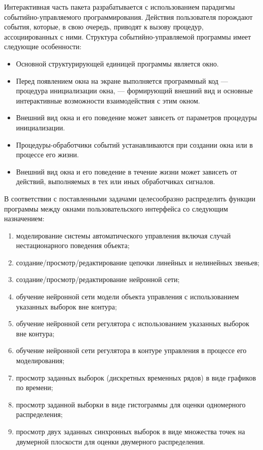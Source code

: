 Интерактивная часть пакета разрабатывается с использованием парадигмы
событийно-управляемого программирования.  Действия пользователя
порождают события, которые, в свою очередь, приводят к вызову
процедур, ассоциированных с ними.  Структура событийно-управляемой
программы имеет следующие особенности:
\begin{itemize}
\item Основной структурирующей единицей программы является окно.
\item Перед появлением окна на экране выполняется программный код ---
  процедура инициализации окна, --- формирующий внешний вид и основные
  интерактивные возможности взаимодействия с этим окном.
\item Внешний вид окна и его поведение может зависеть от параметров
  процедуры инициализации.
\item Процедуры-обработчики событий устанавливаются при создании окна
  или в процессе его жизни.
\item Внешний вид окна и его поведение в течение жизни может зависеть
  от действий, выполняемых в тех или иных обработчиках сигналов.
\end{itemize}

В соответствии с поставленными задачами целесообразно распределить
функции программы между окнами пользовательского интерфейса со
следующим назначением:
\begin{enumerate}
\item моделирование системы автоматического управления включая случай
  нестационарного поведения объекта;
\item создание/просмотр/редактирование цепочки линейных и нелинейных
  звеньев;
\item создание/просмотр/редактирование нейронной сети;
\item обучение нейронной сети модели объекта управления с
  использованием указанных выборок вне контура;
\item обучение нейронной сети регулятора с использованием указанных
  выборок вне контура;
\item обучение нейронной сети регулятора в контуре управления в
  процессе его моделирования;
\item просмотр заданных выборок (дискретных временных рядов) в виде
  графиков по времени;
\item просмотр заданной выборки в виде гистограммы для оценки
  одномерного распределения;
\item просмотр двух заданных синхронных выборок в виде множества точек
  на двумерной плоскости для оценки двумерного распределения.
\end{enumerate}

